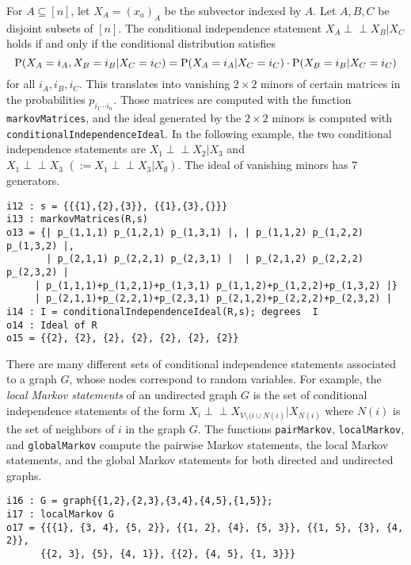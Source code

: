 \documentclass[letterpaper]{article}
\theoremstyle{definition}
\def\ci{\perp\!\!\!\perp}
\begin{document}
For $A \subseteq [n]$, let $X_{A} = (x_{a})_{A}$ be the subvector
indexed by $A$.  Let $A,B,C$ be disjoint subsets of $[n]$.  
The conditional independence statement
$X_{A} \ci X_{B} | X_{C}$ holds if and only if the conditional
distribution satisfies
$$
{\rm P}(X_{A} = i_{A}, X_{B} = i_{B} | X_{C} = i_{C}) =
{\rm P}(X_{A} = i_{A} | X_{C} = i_{C})\cdot {\rm P}( X_{B} = i_{B} | X_{C} = i_{C})$$
for all $i_{A}, i_{B}, i_{C}$.   This translates into vanishing
$2\times 2$ minors of certain matrices in the probabilities 
$p_{i_{1}\cdots i_{n}}$.  Those matrices are computed with the 
function {\tt markovMatrices},
and the ideal generated by the $2 \times 2$ minors is computed with 
{\tt conditionalIndependenceIdeal}.  In the following example,
the two conditional independence statements are $X_{1} \ci X_{2} | X_{3}$
and $X_{1} \ci X_{3} \, \,  (:=  X_{1} \ci X_{3} | X_{\emptyset})$. The ideal of vanishing minors has $7$ generators. 

\begin{verbatim}
i12 : s = {{{1},{2},{3}}, {{1},{3},{}}}
i13 : markovMatrices(R,s)
o13 = {| p_(1,1,1) p_(1,2,1) p_(1,3,1) |, | p_(1,1,2) p_(1,2,2) p_(1,3,2) |, 
       | p_(2,1,1) p_(2,2,1) p_(2,3,1) |  | p_(2,1,2) p_(2,2,2) p_(2,3,2) |  
     | p_(1,1,1)+p_(1,2,1)+p_(1,3,1) p_(1,1,2)+p_(1,2,2)+p_(1,3,2) |}
     | p_(2,1,1)+p_(2,2,1)+p_(2,3,1) p_(2,1,2)+p_(2,2,2)+p_(2,3,2) |
i14 : I = conditionalIndependenceIdeal(R,s); degrees  I 
o14 : Ideal of R
o15 = {{2}, {2}, {2}, {2}, {2}, {2}, {2}}
\end{verbatim}

There are many different sets of conditional independence statements
associated to a graph $G$, whose nodes correspond to random variables.
For example, the \emph{local Markov statements} of an undirected graph $G$
is the set of conditional independence statements of the form
$X_{i} \ci X_{V \setminus (i \cup N(i)} | X_{N(i)}$ where $N(i)$ is the set of neighbors of $i$ in the graph $G$.
The functions {\tt pairMarkov}, {\tt localMarkov}, and {\tt globalMarkov}
compute the pairwise Markov statements, the local Markov statements, and the global Markov statements for both directed and undirected graphs.

\begin{verbatim}
i16 : G = graph{{1,2},{2,3},{3,4},{4,5},{1,5}};
i17 : localMarkov G
o17 = {{{1}, {3, 4}, {5, 2}}, {{1, 2}, {4}, {5, 3}}, {{1, 5}, {3}, {4, 2}}, 
      {{2, 3}, {5}, {4, 1}}, {{2}, {4, 5}, {1, 3}}}
\end{verbatim}
\end{document}
